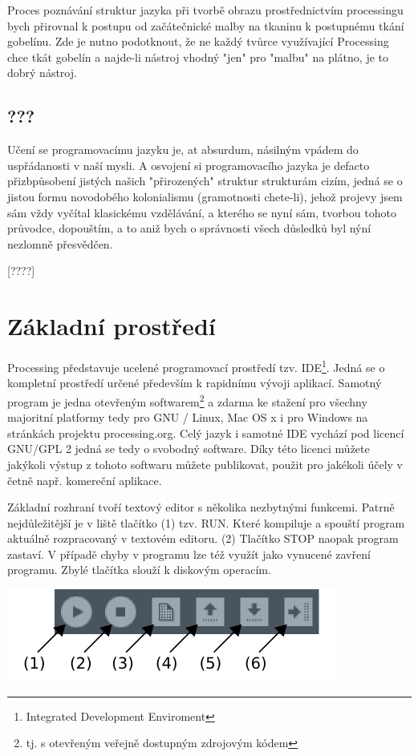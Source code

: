 \documentclass[11pt]{article}
\begin{document}
Proces poznávání struktur jazyka při tvorbě obrazu prostřednictvím processingu bych přirovnal k postupu od začátečnické malby na tkaninu k postupnému tkání gobelínu. Zde je nutno podotknout, že ne každý tvůrce využívající Processing chce tkát gobelín a najde-li nástroj vhodný "jen" pro "malbu" na plátno, je to dobrý nástroj.

\subsection{???}



Učení se programovacímu jazyku je, at absurdum, násilným vpádem do uspřádanosti v naší mysli. A osvojení si programovacího jazyka je defacto přizbpůsobení jistých našich "přirozených" struktur strukturám cizím, jedná se o jistou formu novodobého kolonialismu (gramotnosti chete-li), jehož projevy jsem sám vždy vyčítal klasickému vzdělávání, a kterého se nyní sám, tvorbou tohoto průvodce, dopouštím, a to aniž bych o správnosti všech důsledků byl nýní nezlomně přesvědčen.

[????]

\newpage
\section{Základní prostředí}

Processing představuje ucelené programovací prostředí tzv. IDE\footnote{Integrated Development Enviroment}. Jedná se o kompletní prostředí určené především k rapidnímu vývoji aplikací. Samotný program je jedna otevřeným softwarem\footnote{tj. s otevřeným veřejně dostupným zdrojovým kódem} a zdarma ke stažení pro všechny majoritní platformy tedy pro GNU / Linux, Mac OS x i pro Windows na stránkách projektu processing.org. Celý jazyk i samotné IDE vychází pod licencí GNU/GPL 2 jedná se tedy o svobodný software. Díky této licenci můžete jakýkoli výstup z tohoto softwaru můžete publikovat, použit pro jakékoli účely v četně např. komereční aplikace.


Základní rozhraní tvoří textový editor s několika nezbytnými funkcemi. Patrně nejdůležitější je v liště tlačítko (1) tzv. RUN. Které kompiluje a spouští program aktuálně rozpracovaný v textovém editoru. (2) Tlačítko STOP naopak program zastaví. V případě chyby v programu lze též využít jako vynucené zavření programu. Zbylé tlačítka slouží k diskovým operacím. \\


\begin{center}
\includegraphics[scale = 1]{imgs/buttons.png}
\end{center}
\end{document}
